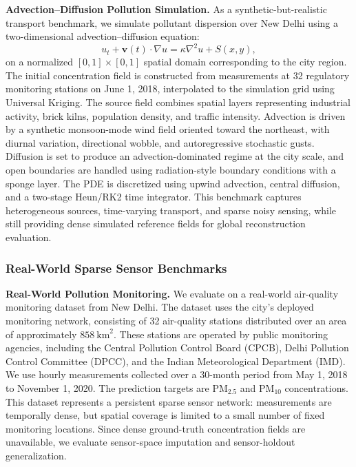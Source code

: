 \noindent\textbf{Advection--Diffusion Pollution Simulation.}
As a synthetic-but-realistic transport benchmark, we simulate pollutant dispersion over New Delhi using a two-dimensional advection--diffusion equation:
\[
u_t + \mathbf{v}(t)\cdot\nabla u
=
\kappa \nabla^2 u + S(x,y),
\]
on a normalized $[0,1]\times[0,1]$ spatial domain corresponding to the city region. The initial concentration field is constructed from measurements at 32 regulatory monitoring stations on June 1, 2018, interpolated to the simulation grid using Universal Kriging. The source field combines spatial layers representing industrial activity, brick kilns, population density, and traffic intensity. Advection is driven by a synthetic monsoon-mode wind field oriented toward the northeast, with diurnal variation, directional wobble, and autoregressive stochastic gusts. Diffusion is set to produce an advection-dominated regime at the city scale, and open boundaries are handled using radiation-style boundary conditions with a sponge layer. The PDE is discretized using upwind advection, central diffusion, and a two-stage Heun/RK2 time integrator. This benchmark captures heterogeneous sources, time-varying transport, and sparse noisy sensing, while still providing dense simulated reference fields for global reconstruction evaluation.

\subsubsection{Real-World Sparse Sensor Benchmarks}
\label{sec:real_datasets}

\noindent\textbf{Real-World Pollution Monitoring.}
We evaluate on a real-world air-quality monitoring dataset from New Delhi. The dataset uses the city's deployed monitoring network, consisting of 32 air-quality stations distributed over an area of approximately $858~\mathrm{km}^2$. These stations are operated by public monitoring agencies, including the Central Pollution Control Board (CPCB), Delhi Pollution Control Committee (DPCC), and the Indian Meteorological Department (IMD). We use hourly measurements collected over a 30-month period from May 1, 2018 to November 1, 2020. The prediction targets are PM$_{2.5}$ and PM$_{10}$ concentrations. This dataset represents a persistent sparse sensor network: measurements are temporally dense, but spatial coverage is limited to a small number of fixed monitoring locations. Since dense ground-truth concentration fields are unavailable, we evaluate sensor-space imputation and sensor-holdout generalization.

